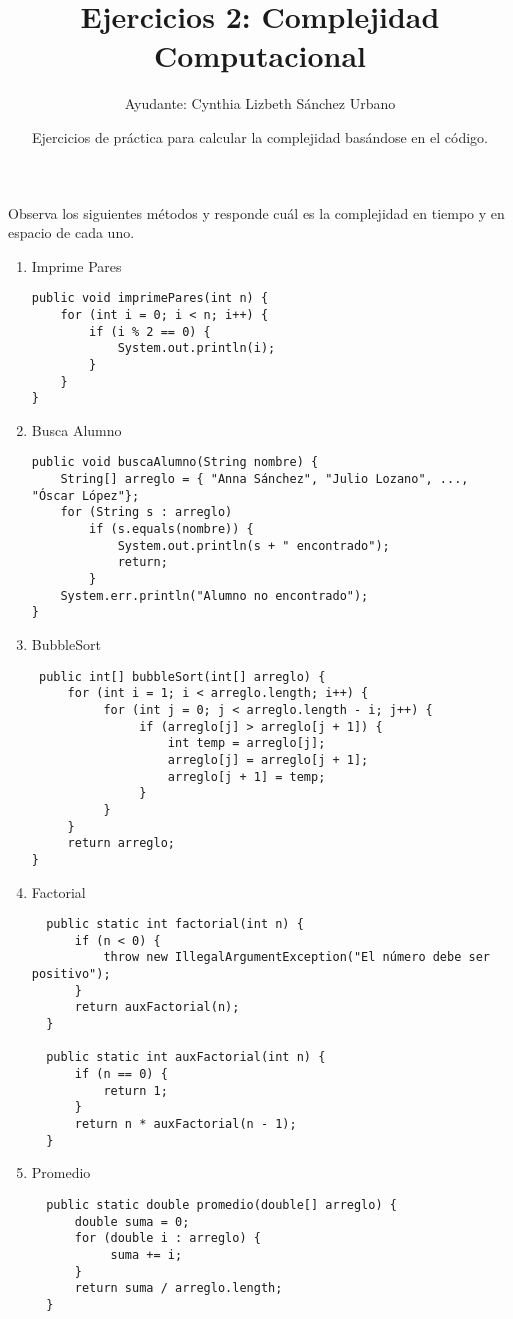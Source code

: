 \documentclass[12pt]{article} %
\begin{document}
\title{Ejercicios 2: Complejidad Computacional}
\author{Ayudante: Cynthia Lizbeth Sánchez Urbano}
\date{Ejercicios de práctica para calcular la complejidad basándose en el código.}
\maketitle
Observa los siguientes métodos y responde cuál es la complejidad en tiempo y en espacio de cada uno.
\begin{enumerate}
\item Imprime Pares
\begin{lstlisting}
public void imprimePares(int n) {
    for (int i = 0; i < n; i++) {
        if (i % 2 == 0) {
            System.out.println(i);
        }
    }
}
\end{lstlisting}
\item Busca Alumno
\begin{lstlisting}
public void buscaAlumno(String nombre) {
    String[] arreglo = { "Anna Sánchez", "Julio Lozano", ..., "Óscar López"};
    for (String s : arreglo)
        if (s.equals(nombre)) {
            System.out.println(s + " encontrado");
            return;
        }
    System.err.println("Alumno no encontrado");
}
\end{lstlisting}
\item BubbleSort
\begin{lstlisting}
 public int[] bubbleSort(int[] arreglo) {
     for (int i = 1; i < arreglo.length; i++) {
          for (int j = 0; j < arreglo.length - i; j++) {
               if (arreglo[j] > arreglo[j + 1]) {
                   int temp = arreglo[j];
                   arreglo[j] = arreglo[j + 1];
                   arreglo[j + 1] = temp;
               }
          }
     }
     return arreglo;
}
\end{lstlisting}
\item Factorial
\begin{lstlisting}
  public static int factorial(int n) {
      if (n < 0) {
          throw new IllegalArgumentException("El número debe ser positivo");
      }
      return auxFactorial(n);
  }

  public static int auxFactorial(int n) {
      if (n == 0) {
          return 1;
      }
      return n * auxFactorial(n - 1);
  }
\end{lstlisting}
\item Promedio
\begin{lstlisting}
  public static double promedio(double[] arreglo) {
      double suma = 0;
      for (double i : arreglo) {
           suma += i;
      }
      return suma / arreglo.length;
  }
\end{lstlisting}
\end{enumerate}
\end{document}
